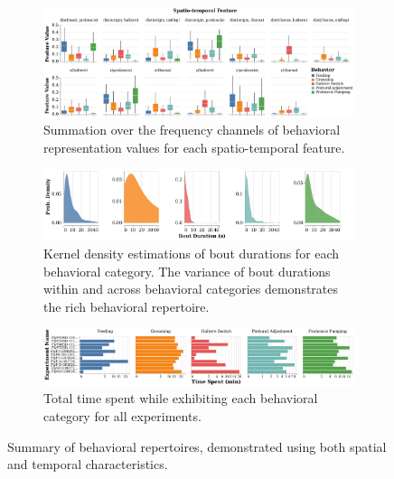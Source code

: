 \begin{figure}[htb!]
	\centering
	\begin{subfigure}[b]{0.995\linewidth}
		\centering
		\includegraphics[width=\linewidth]{figures/FeatureDistributions_perBehavior-Ann.pdf}
		\caption{Summation over the frequency channels of behavioral representation values for each spatio-temporal feature.\label{figure:feature-distributions}}
	\end{subfigure}%

	\centering
	\begin{subfigure}[b]{0.995\linewidth}
		\centering
		\includegraphics[width=\linewidth]{figures/BoutDurationDistributions-Ann.pdf}
		\caption{Kernel density estimations of bout durations for each behavioral category. The variance of bout durations within and across behavioral categories demonstrates the rich behavioral repertoire. \label{figure:bout-durations}}
	\end{subfigure}%

	\centering
	\begin{subfigure}[b!]{0.995\linewidth}
		\centering
		\includegraphics[width=\linewidth]{figures/TimeSpent-perBehavior-Ann.pdf}
		\caption{Total time spent while exhibiting each behavioral category for all experiments. \label{figure:time-spent-in-behaviors}}
	\end{subfigure}%
	\caption{Summary of behavioral repertoires, demonstrated using both spatial and temporal characteristics. \label{figure:summary-behavior-characteristics}}
\end{figure}


